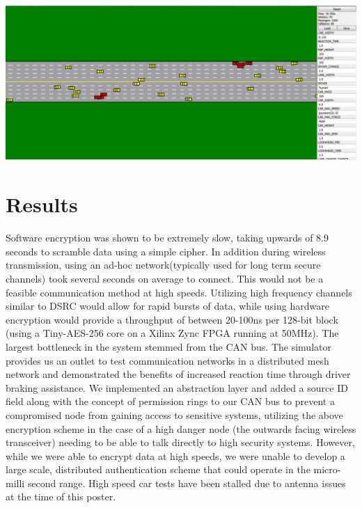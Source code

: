 \documentclass[a0,landscape]{a0poster}
\begin{document}
\begin{multicols}{3}
\includegraphics[width=1\linewidth]{car_sim}
\vspace{2em}



\section*{Results}
Software encryption was shown to be extremely slow, taking upwards of 8.9 seconds to scramble data using a simple cipher. In addition during wireless transmission, using an ad-hoc network(typically used for long term secure channels) took several seconds on average to connect. This would not be a feasible communication method at high speeds. Utilizing high frequency channels similar to DSRC would allow for rapid bursts of data, while using hardware encryption would provide a throughput of between 20-100ns per 128-bit block (using a Tiny-AES-256 core on a Xilinx Zync FPGA running at 50MHz). The largest bottleneck in the system stemmed from the CAN bus.
The simulator provides us an outlet to test communication networks in a distributed mesh network and demonstrated the benefits of increased reaction time through driver braking assistance. We implemented an abstraction layer and added a source ID field along with the concept of permission rings to our CAN bus to prevent a compromised node from gaining access to sensitive systems, utilizing the above encryption scheme in the case of a high danger node (the outwards facing wireless transceiver) needing to be able to talk directly to high security systems. However, while we were able to encrypt  data at high speeds, we were unable to develop a large scale, distributed authentication scheme that could operate in the micro-milli second range. High speed car tests have been stalled due to antenna issues at the time of this poster.	


\end{multicols}
\end{document}
